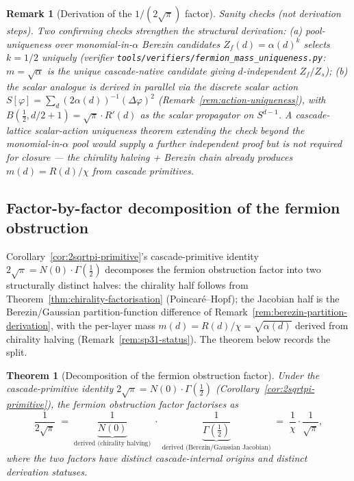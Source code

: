 \documentclass[12pt,a4paper]{article}
\newtheorem{theorem}{Theorem}[section]
\newtheorem*{remark}{Remark}
\begin{document}
\begin{remark}[Derivation of the $1/(2\sqrt{\pi})$ factor]
\medskip\noindent\emph{Sanity checks (not derivation steps).} Two confirming checks strengthen the structural derivation: (a) pool-uniqueness over monomial-in-$\alpha$ Berezin candidates $Z_f(d) = \alpha(d)^k$ selects $k = 1/2$ uniquely (verifier \texttt{tools/verifiers/fermion\_mass\_uniqueness.py}: $m = \sqrt{\alpha}$ is the unique cascade-native candidate giving $d$-independent $Z_f/Z_s$); (b) the scalar analogue is derived in parallel via the discrete scalar action $S[\varphi] = \sum_d (2\alpha(d))^{-1}(\Delta\varphi)^2$ (Remark~\ref{rem:action-uniqueness}), with $B(\tfrac12, d/2+1) = \sqrt{\pi}\cdot R'(d)$ as the scalar propagator on $S^{d-1}$. A cascade-lattice scalar-action uniqueness theorem extending the check beyond the monomial-in-$\alpha$ pool would supply a further independent proof but is not required for closure --- the chirality halving + Berezin chain already produces $m(d) = R(d)/\chi$ from cascade primitives.
\end{remark}

\subsection{Factor-by-factor decomposition of the fermion obstruction}
\label{subsec:sp31-decomposition}

Corollary~\ref{cor:2sqrtpi-primitive}'s cascade-primitive identity
$2\sqrt{\pi} = N(0)\cdot\Gamma(\tfrac{1}{2})$ decomposes the fermion
obstruction factor into two structurally distinct halves: the chirality
half follows from Theorem~\ref{thm:chirality-factorisation}
(Poincar\'e--Hopf); the Jacobian half is the Berezin/Gaussian
partition-function difference of Remark~\ref{rem:berezin-partition-derivation},
with the per-layer mass $m(d) = R(d)/\chi = \sqrt{\alpha(d)}$ derived from
chirality halving (Remark~\ref{rem:sp31-status}). The theorem below
records the split.

\begin{theorem}[Decomposition of the fermion obstruction factor]\label{thm:sp31-decomposition}
Under the cascade-primitive identity
$2\sqrt{\pi} = N(0)\cdot\Gamma(\tfrac{1}{2})$
(Corollary~\ref{cor:2sqrtpi-primitive}), the fermion obstruction factor
factorises as
\[
\frac{1}{2\sqrt{\pi}}
\;=\;
\underbrace{\frac{1}{N(0)}}_{\text{derived (chirality halving)}}
\;\cdot\;
\underbrace{\frac{1}{\Gamma(\tfrac{1}{2})}}_{\text{derived (Berezin/Gaussian Jacobian)}}
\;=\;
\frac{1}{\chi}\cdot\frac{1}{\sqrt{\pi}},
\]
where the two factors have distinct cascade-internal origins and
distinct derivation statuses.
\end{theorem}
\end{document}
